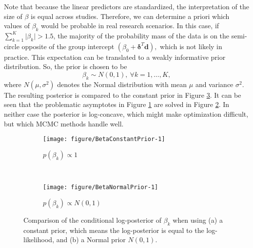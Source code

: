 \documentclass[11pt,a4paper]{article}\usepackage[]{graphicx}\usepackage[]{color}
\makeatletter
\def\maxwidth{ %
  \ifdim\Gin@nat@width>\linewidth
    \linewidth
  \else
    \Gin@nat@width
  \fi
}
\newenvironment{knitrout}{}{} %
\newcommand{\bd}{\boldsymbol{d}}
\newcommand{\bdt}{\boldsymbol{\delta}}
\makeatother
\begin{document}
Note that because the linear predictors are standardized, the interpretation of the size of \( \beta \) is equal across studies. Therefore, we can determine a priori which values of \( \beta_k \) would be probable in real research scenarios. In this case, if \( \sum_{k=1}^K \vert \beta_k \vert > 1.5 \), the majority of the probability mass of the data is on the semi-circle opposite of the group intercept \( (\beta_0 + \bdt^T \bd),\) which is not likely in practice. This expectation can be translated to a weakly informative prior distribution. So, the prior is chosen to be
\begin{equation}
\beta_k \sim N(0, 1), ~ \forall k = 1, \dots, K,
\end{equation}
 where \( N(\mu, \sigma^2) \) denotes the Normal distribution with mean \( \mu \) and variance \( \sigma^2.\) The resulting posterior is compared to the constant prior in Figure \ref{LikelihoodPriorComparisonBeta}. It can be seen that the problematic asymptotes in Figure \ref{BetaConstantPrior} are solved in Figure \ref{BetaNormalPrior}. In neither case the posterior is log-concave, which might make optimization difficult, but which MCMC methods handle well.





\begin{figure}


\begin{subfigure}[b]{0.5\textwidth}
\begin{knitrout}
\color{fgcolor}
\texttt{[image: figure/BetaConstantPrior-1]} 

\end{knitrout}
\caption{$p(\beta_k) \propto 1$}
\label{BetaConstantPrior}
\end{subfigure}
~
\begin{subfigure}[b]{0.5\textwidth}
\begin{knitrout}
\color{fgcolor}
\texttt{[image: figure/BetaNormalPrior-1]} 

\end{knitrout}
\caption{$p(\beta_k) \propto N(0, 1)$}
\label{BetaNormalPrior}
\end{subfigure}

\caption{Comparison of the conditional log-posterior of $\beta_k$ when using (a) a constant prior, which means the log-posterior is equal to the log-likelihood, and (b) a Normal prior $N(0, 1)$.}
\label{LikelihoodPriorComparisonBeta}
\end{figure}
\end{document}
